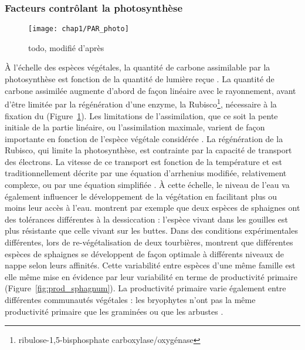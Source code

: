 \subsubsection{Facteurs contrôlant la photosynthèse}

\begin{figure}
\centering
\texttt{[image: chap1/PAR\_photo]}
\caption{todo, modifié d'après \citet{long1993}}
\label{fig:PAR_photo}
\end{figure}

À l'échelle des espèces végétales, la quantité de carbone assimilable par la photosynthèse est fonction de la quantité de lumière reçue \citep{long1993}.
La quantité de carbone assimilée augmente d'abord de façon linéaire avec le rayonnement, avant d'être limitée par la régénération d'une enzyme, la Rubisco\footnote{ribulose-1,5-bisphosphate carboxylase/oxygénase}, nécessaire à la fixation du \coo (Figure~\ref{fig:PAR_photo}).
Les limitations de l'assimilation, que ce soit la pente initiale de la partie linéaire, ou l'assimilation maximale, varient de façon importante en fonction de l'espèce végétale considérée \citep{wullschleger1993}.
La régénération de la Rubisco, qui limite la photosynthèse, est contrainte par la capacité de transport des électrons.
La vitesse de ce transport est fonction de la température et est traditionnellement décrite par une équation d'arrhenius modifiée, relativement complexe, ou par une équation simplifiée \citep{farquhar1980,june2004}.
À cette échelle, le niveau de l'eau va également influencer le développement de la végétation en facilitant plus ou moins leur accès à l'eau.
\citet{wagner1984} montrent par exemple que deux espèces de sphaignes ont des tolérances différentes à la dessiccation : l'espèce vivant dans les gouilles est plus résistante que celle vivant sur les buttes.
Dans des conditions expérimentales différentes, lors de re-végétalisation de deux tourbières, \cite{robroek2009} montrent que différentes espèces de sphaignes se développent de façon optimale à différents niveaux de nappe selon leurs affinités.
Cette variabilité entre espèces d'une même famille est elle même mise en évidence par leur variabilité en terme de productivité primaire (Figure~\ref{fig:prod_sphagnum}).
La productivité primaire varie également entre différentes communautés végétales : les bryophytes n'ont pas la même productivité primaire que les graminées ou que les arbustes \citetext{\citealp{moore2002} dans \citealp{rydin2013b}}.

